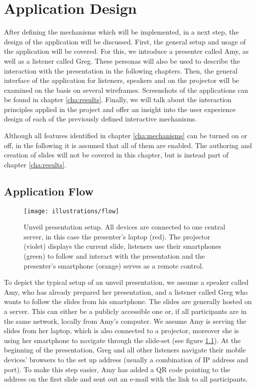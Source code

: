 \chapter{Application Design}
\label{cha:design}

After defining the mechanisms which will be implemented, in a next step, the design of the application will be discussed. First, the general setup and usage of the application will be covered. For this, we introduce a presenter called Amy, as well as a listener called Greg. These personas will also be used to describe the interaction with the presentation in the following chapters.
Then, the general interface of the application for listeners, speakers and on the projector will be examined on the basis on several wireframes. Screenshots of the applications can be found in chapter \ref{cha:results}. Finally, we will talk about the interaction principles applied in the project and offer an insight into the user experience design of each of the previously defined interactive mechanisms.

Although all features identified in chapter \ref{cha:mechanisms} can be turned on or off, in the following it is assumed that all of them are enabled. The authoring and creation of slides will not be covered in this chapter, but is instead part of chapter \ref{cha:results}.

\section{Application Flow}

\begin{figure}
\centering
\texttt{[image: illustrations/flow]}
\caption{Unveil presentation setup. All devices are connected to one central server, in this case the presenter's laptop (red). The projector (violet) displays the current slide, listeners use their smartphones (green) to follow and interact with the presentation and the presenter's smartphone (orange) serves as a remote control.}
\label{fig:design-flow}
\end{figure}

To depict the typical setup of an unveil presentation, we assume a speaker called Amy, who has already prepared her presentation, and a listener called Greg who wants to follow the slides from his smartphone.
The slides are generally hosted on a server. This can either be a publicly accessible one or, if all participants are in the same network, locally from Amy's computer. We assume Amy is serving the slides from her laptop, which is also connected to a projector, moreover she is using her smartphone to navigate through the slide-set (see figure \ref{fig:design-flow}).
At the beginning of the presentation, Greg and all other listeners navigate their mobile devices' browsers to the set up address (usually a combination of IP address and port). To make this step easier, Amy has added a QR code pointing to the address on the first slide and sent out an e-mail with the link to all participants.

